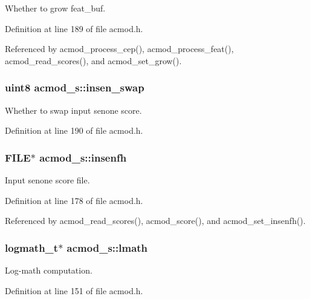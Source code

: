 Whether to grow feat\-\_\-buf. 



Definition at line 189 of file acmod.\-h.



Referenced by acmod\-\_\-process\-\_\-cep(), acmod\-\_\-process\-\_\-feat(), acmod\-\_\-read\-\_\-scores(), and acmod\-\_\-set\-\_\-grow().

\subsubsection[{insen\-\_\-swap}]{\setlength{\rightskip}{0pt plus 5cm}uint8 acmod\-\_\-s\-::insen\-\_\-swap}\label{structacmod__s_ae6ed7e1e5b4bec021a0ba17c0ac02bd7}


Whether to swap input senone score. 



Definition at line 190 of file acmod.\-h.

\subsubsection[{insenfh}]{\setlength{\rightskip}{0pt plus 5cm}F\-I\-L\-E$\ast$ acmod\-\_\-s\-::insenfh}\label{structacmod__s_ad0998a9d887db82bd684e9454c9b044e}


Input senone score file. 



Definition at line 178 of file acmod.\-h.



Referenced by acmod\-\_\-read\-\_\-scores(), acmod\-\_\-score(), and acmod\-\_\-set\-\_\-insenfh().

\subsubsection[{lmath}]{\setlength{\rightskip}{0pt plus 5cm}logmath\-\_\-t$\ast$ acmod\-\_\-s\-::lmath}\label{structacmod__s_a9de7e8ac9c0c4df3d2a9ad5406787f3c}


Log-\/math computation. 



Definition at line 151 of file acmod.\-h.



